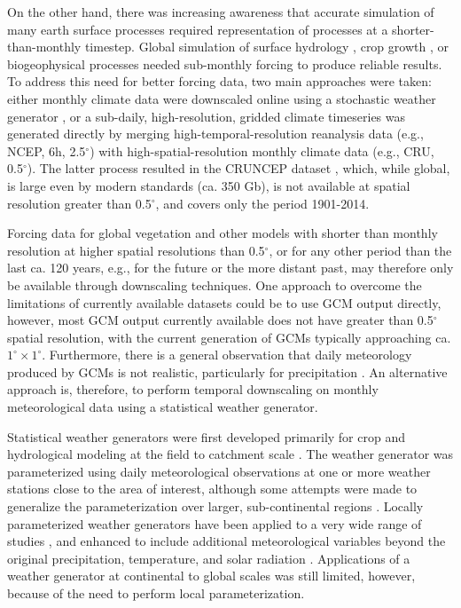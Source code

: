 \begin{refsection}
On the other hand, there was increasing awareness that accurate simulation of many earth surface processes required representation of processes at a shorter-than-monthly timestep. Global simulation of surface hydrology \citep{GertenSchaphoffHaberlandtEtAl2004}, crop growth \citep{BondeauSmithZaehleEtAl2007}, or biogeophysical processes \citep{KrinnerViovyNoblet-DucoudreEtAl2005} needed sub-monthly forcing to produce reliable results. To address this need for better forcing data, two main approaches were taken: either monthly climate data were downscaled online using a stochastic weather generator \citep[e.g.,][]{PfeifferSpessaKaplan2013}, or a sub-daily, high-resolution, gridded climate timeseries was generated directly by merging high-temporal-resolution reanalysis data (e.g., NCEP, 6h, 2.5$^{\circ}$) with high-spatial-resolution monthly climate data (e.g., CRU, 0.5$^{\circ}$). The latter process resulted in the CRUNCEP dataset \citep{ViovyCiais2016,WeiLiuHuntzingerEtAl2014}, which, while global, is large even by modern standards (ca. 350 Gb), is not available at spatial resolution greater than 0.5$^{\circ}$, and covers only the period 1901-2014.

Forcing data for global vegetation and other models with shorter than monthly resolution at higher spatial resolutions than 0.5$^{\circ}$, or for any other period than the last ca. 120 years, e.g., for the future or the more distant past, may therefore only be available through downscaling techniques. One approach to overcome the limitations of currently available datasets could be to use GCM output directly, however, most GCM output currently available does not have greater than 0.5$^{\circ}$ spatial resolution, with the current generation of GCMs typically approaching ca. $1^{\circ}\times1^{\circ}$. Furthermore, there is a general observation that daily meteorology produced by GCMs is not realistic, particularly for precipitation \citep{Dai2006,StephensLEcuyerForbesEtAl2010,SunSolomonDaiEtAl2006}. An alternative approach is, therefore, to perform temporal downscaling on monthly meteorological data using a statistical weather generator.

Statistical weather generators were first developed primarily for crop and hydrological modeling at the field to catchment scale \citep{Richardson1981,WoolhiserPegram1979,WoolhiserRoldan1982}. The weather generator was parameterized using daily meteorological observations at one or more weather stations close to the area of interest, although some attempts were made to generalize the parameterization over larger, sub-continental regions \citep[e.g.,][]{Wilks1999a,Wilks1998,WoolhiserRoldan1986}. Locally parameterized weather generators have been applied to a very wide range of studies \citep{Wilks2010,WilksWilby1999}, and enhanced to include additional meteorological variables beyond the original precipitation, temperature, and solar radiation \citep[e.g.,][]{ParlangeKatz2000}. Applications of a weather generator at continental to global scales was still limited, however, because of the need to perform local parameterization.


\end{refsection}
